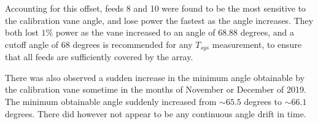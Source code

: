 \documentclass[10pt, a4paper]{article}
\begin{document}
Accounting for this offset, feeds 8 and 10 were found to be the most sensitive to the calibration vane angle, and lose power the fastest as the angle increases. They both lost $1\%$ power as the vane increased to an angle of $68.88$ degrees, and a cutoff angle of $68$ degrees is recommended for any $T_{sys}$ measurement, to ensure that all feeds are sufficiently covered by the array.

There was also observed a sudden increase in the minimum angle obtainable by the calibration vane sometime in the months of November or December of 2019. The minimum obtainable angle suddenly increased from $\sim 65.5$ degrees to $\sim 66.1$ degrees. There did however not appear to be any continuous angle drift in time.
\end{document}
